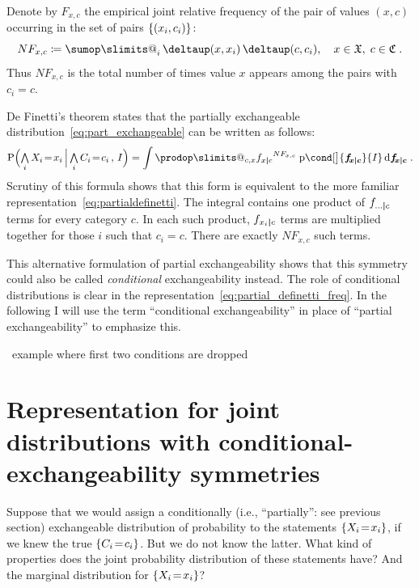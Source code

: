 \documentclass[\ifafour a4paper,12pt,\else a5paper,10pt,\fi%
onecolumn,oneside,article,%
british%
]{memoir}
\makeatletter
\theoremstyle{remark}
\theoremstyle{innote}
\def\sum{\DOTSI\sumop\slimits@}
\def\prod{\DOTSI\prodop\slimits@}
\newcommand*{\delt}{\deltaup}%
\newcommand*{\di}{\mathrm{d}}%
\newcommand*{\defd}{\coloneqq}
\newcommand*{\Land}{\mathop{\textstyle\bigwedge}}
\DeclarePairedDelimiter\set{\{}{\}}
\newcommand*{\pf}{\mathrm{p}}%
\newcommand*{\p}{\mathrm{P}}%
\renewcommand*{\|}[1][]{\nonscript\,#1\vert\nonscript\,\mathopen{}}
\newcommand*{\ie}{{i.e.}}
\newcommand*{\tsum}{\mathop{\textstyle\sum}\nolimits}
\newcommand*{\puzzle}{{\fontencoding{U}\fontfamily{fontawesometwo}\selectfont\symbol{225}}}
\newcommand{\mynote}[1]{ {\color{notecolour}\puzzle\ #1}}
\renewcommand*{\=}{\TextOrMath\texteq\eq}
\newcommand*{\X}[1]{X_{#1}}
\newcommand*{\x}[1]{x_{#1}}
\newcommand*{\C}[1]{C_{#1}}
\newcommand*{\cc}[1]{c_{#1}}
\newcommand*{\sx}{\mathfrak{X}}
\newcommand*{\sC}{\mathfrak{C}}
\newcommand*{\fxc}{\bm{f_{\!x\bcond c}}}
\newcommand*{\bcond}[1][]{\nonscript\,#1\bm{\vert}\nonscript\;\mathopen{}}
\makeatother
\begin{document}
Denote by $F_{x,c}$ the empirical joint relative frequency of the pair of
values $(x,c)$ occurring in the set of pairs $\set{(\x{i}, \cc{i})}$:
\begin{equation}
  \label{eq:rel_frequencies}
  N F_{x,c} \defd \tsum_{i}\delt(x, \x{i})\,\delt(c, \cc{i}),
  \quad x \in \sx,\; c \in \sC \;.
\end{equation}
Thus $N F_{x,c}$ is the total number of times value $x$ appears among the
pairs with $\cc{i}=c$.

De Finetti’s theorem states that the partially exchangeable
distribution~\eqref{eq:part_exchangeable} can be written as follows:
\begin{equation}
  \label{eq:partial_definetti_freq}
    \p\Bigl(\Land_{i} \X{i}\=\x{i} \|[\Big]
    \Land_{i}\C{i}\=\cc{i}\,,\,  I\Bigr) =
\int\prod_{c,x} {f_{x \bcond c}}^{N F_{x, c}}\;
\pf\cond[\big]{\fxc}{I} \,\di\fxc \;.
\end{equation}
Scrutiny of this formula shows that this form is equivalent to the more
familiar representation~\eqref{eq:partialdefinetti}. The integral contains
one product of $f_{\dotso \bcond c}$ terms for every category $c$. In each
such product, $f_{\x{i} \bcond c}$ terms are multiplied together for those
$i$ such that $\cc{i}=c$. There are exactly $N F_{x,c}$ such terms.

This alternative formulation of partial exchangeability shows that this
symmetry could also be called \emph{conditional} exchangeability instead.
The role of conditional distributions is clear in the
representation~\eqref{eq:partial_definetti_freq}. In the following I will
use the term \enquote{conditional exchangeability} in place of
\enquote{partial exchangeability} to emphasize this.


\mynote{example where first two conditions are dropped}






\section{Representation for joint distributions with
  conditional-exchangeability symmetries}
\label{sec:result}

Suppose that we would assign a conditionally (\ie, \enquote{partially}: see
previous section) exchangeable distribution of probability to the
statements $\set{\X{i}\=\x{i}}$, if we knew the true $\set{\C{i}\=\cc{i}}$.
But we do not know the latter. What kind of properties does the joint
probability distribution of these statements have? And the marginal
distribution for $\set{\X{i}\=\x{i}}$?
\end{document}
